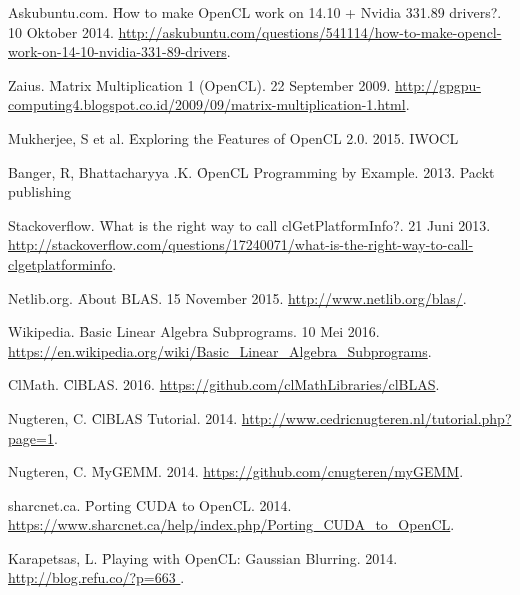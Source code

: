 %
% 

% 
% 
\begin{thebibliography}{4}

{Askubuntu.com. \f{How to make OpenCL work on 14.10 + Nvidia 331.89 drivers?}. 10 Oktober 2014. \url{http://askubuntu.com/questions/541114/how-to-make-opencl-work-on-14-10-nvidia-331-89-drivers}.}

{Zaius. \f{Matrix Multiplication 1 (OpenCL)}. 22 September 2009. \url{http://gpgpu-computing4.blogspot.co.id/2009/09/matrix-multiplication-1.html}.}

{Mukherjee, S et al. \f{Exploring the Features of OpenCL 2.0}. 2015. IWOCL }

{Banger, R, Bhattacharyya .K. \f{OpenCL Programming by Example}. 2013. Packt publishing }

{Stackoverflow. \f{What is the right way to call clGetPlatformInfo?}. 21 Juni 2013. \url{http://stackoverflow.com/questions/17240071/what-is-the-right-way-to-call-clgetplatforminfo}.}

{Netlib.org. \f{About BLAS}. 15 November 2015. \url{http://www.netlib.org/blas/​​}.}

{Wikipedia. \f{Basic Linear Algebra Subprograms}. 10 Mei 2016. \url{https://en.wikipedia.org/wiki/Basic_Linear_Algebra_Subprograms}.}

{ClMath. \f{ClBLAS}. 2016. \url{https://github.com/clMathLibraries/clBLAS}.}

{Nugteren, C. \f{ClBLAS Tutorial}. 2014. \url{http://www.cedricnugteren.nl/tutorial.php?page=1}.}

{Nugteren, C. \f{MyGEMM}. 2014. \url{https://github.com/cnugteren/myGEMM}.}

{sharcnet.ca. \f{Porting CUDA to OpenCL}. 2014. \url{https://www.sharcnet.ca/help/index.php/Porting_CUDA_to_OpenCL}.}

{Karapetsas, L. \f{Playing with OpenCL: Gaussian Blurring}. 2014. \url{ http://blog.refu.co/?p=663 }.}

​
\end{thebibliography}
